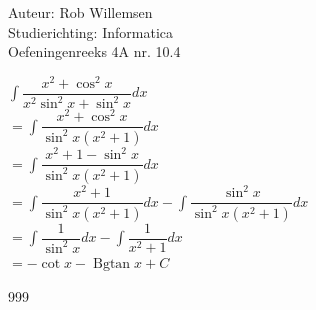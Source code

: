 \documentclass[a4paper]{article}
\newcommand{\dint}{\displaystyle\int}
\newcommand{\Bgtan}{\operatorname{Bgtan}}
\begin{document}
\noindent \large Auteur: Rob Willemsen \\
\noindent \large Studierichting: Informatica \\
\noindent \large Oefeningenreeks 4A nr. 10.4 \\

\medskip

\normalsize

$\dint \dfrac{x^2 + \cos^2x}{x^2\sin^2x + \sin^2x} dx$ \\

$= \dint \dfrac{x^2 + \cos^2x}{\sin^2x(x^2 + 1)} dx$ \\

$= \dint \dfrac{x^2 + 1 - \sin^2x}{\sin^2x(x^2 + 1)} dx$ \\

$= \dint \dfrac{x^2 + 1}{\sin^2x(x^2 + 1)} dx - \dint \dfrac{\sin^2x}{\sin^2x(x^2 + 1)} dx$ \\

$= \dint \dfrac{1}{\sin^2x} dx - \dint \dfrac{1}{x^2 + 1} dx$ \\

$= -\cot x - \Bgtan x + C$ \\

\begin{thebibliography}{999}
\end{thebibliography}
\end{document}
